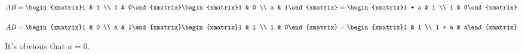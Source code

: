 \begin{exercise}{8}
  $AB = \begin{xmatrix}1 & 1 \\ 1 & 0\end{xmatrix}
        \begin{xmatrix}1 & 0 \\ a & 1\end{xmatrix}
      = \begin{xmatrix}1 + a & 1 \\ 1 & 0\end{xmatrix}$

  $AB = \begin{xmatrix}1 & 0 \\ a & 1\end{xmatrix}
        \begin{xmatrix}1 & 1 \\ 1 & 0\end{xmatrix}
      = \begin{xmatrix}1 & 1 \\ 1 + a & a\end{xmatrix}$

  It's obvious that $a = 0$.
\end{exercise}

